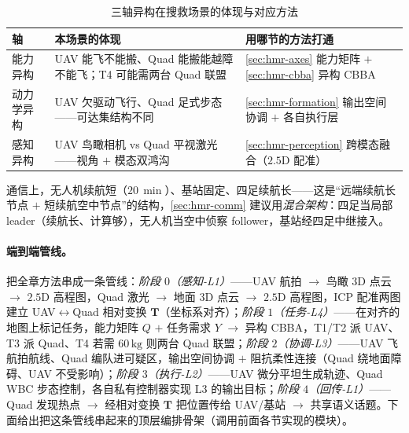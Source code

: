 \begin{table}[H]\centering\small
\caption{三轴异构在搜救场景的体现与对应方法}
\label{tab:hmr-case-axes}
\begin{tabularx}{\linewidth}{lLL}
\toprule
轴 & 本场景的体现 & 用哪节的方法打通 \\
\midrule
能力异构 & UAV 能飞不能搬、Quad 能搬能越障不能飞；T4 可能需两台 Quad 联盟 & \cref{sec:hmr-axes} 能力矩阵 $+$ \cref{sec:hmr-cbba} 异构 CBBA \\
动力学异构 & UAV 欠驱动飞行、Quad 足式步态——可达集结构不同 & \cref{sec:hmr-formation} 输出空间协调 $+$ 各自执行层 \\
感知异构 & UAV 鸟瞰相机 vs Quad 平视激光——视角 $+$ 模态双鸿沟 & \cref{sec:hmr-perception} 跨模态融合（$2.5\mathrm{D}$ 配准） \\
\bottomrule
\end{tabularx}
\end{table}

\noindent 通信上，无人机续航短（$20\,\min$）、基站固定、四足续航长——这是“远端续航长节点 $+$ 短续航空中节点”的结构，\cref{sec:hmr-comm} 建议用\emph{混合架构}：四足当局部 leader（续航长、计算够），无人机当空中侦察 follower，基站经四足中继接入。

\paragraph{端到端管线。}
把全章方法串成一条管线：\emph{阶段 $0$（感知-L1）}——UAV 航拍 $\to$ 鸟瞰 3D 点云 $\to$ $2.5\mathrm{D}$ 高程图，Quad 激光 $\to$ 地面 3D 点云 $\to$ $2.5\mathrm{D}$ 高程图，ICP 配准两图建立 UAV$\leftrightarrow$Quad 相对变换 $\mathbf{T}$（坐标系对齐）；\emph{阶段 $1$（任务-L4）}——在对齐的地图上标记任务，能力矩阵 $Q$ $+$ 任务需求 $Y$ $\to$ 异构 CBBA，T1/T2 派 UAV、T3 派 Quad、T4 若需 $60\,\mathrm{kg}$ 则两台 Quad 联盟；\emph{阶段 $2$（协调-L3）}——UAV 飞航拍航线、Quad 编队进可疑区，输出空间协调 $+$ 阻抗柔性连接（Quad 绕地面障碍、UAV 不受影响）；\emph{阶段 $3$（执行-L2）}——UAV 微分平坦生成轨迹、Quad WBC 步态控制，各自私有控制器实现 L3 的输出目标；\emph{阶段 $4$（回传-L1）}——Quad 发现热点 $\to$ 经相对变换 $\mathbf{T}$ 把位置传给 UAV/基站 $\to$ 共享语义话题。下面给出把这条管线串起来的顶层编排骨架（调用前面各节实现的模块）。


